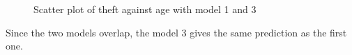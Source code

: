 \begin{answer}
\begin{figure}[H]
        \caption{\label{fig:fig5}Scatter plot of theft against age with model 1 and 3}
    \end{figure}
    Since the two models overlap, the model $3$ gives the same prediction as the first one.
\end{answer}
